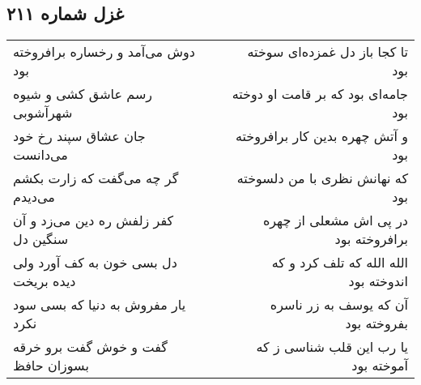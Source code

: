\begin{center}
\section*{غزل شماره ۲۱۱}
\label{sec:sh211}
\begin{longtable}{l p{0.5cm} r}
دوش می‌آمد و رخساره برافروخته بود
&&
تا کجا باز دل غمزده‌ای سوخته بود
\\
رسم عاشق کشی و شیوه شهرآشوبی
&&
جامه‌ای بود که بر قامت او دوخته بود
\\
جان عشاق سپند رخ خود می‌دانست
&&
و آتش چهره بدین کار برافروخته بود
\\
گر چه می‌گفت که زارت بکشم می‌دیدم
&&
که نهانش نظری با من دلسوخته بود
\\
کفر زلفش ره دین می‌زد و آن سنگین دل
&&
در پی اش مشعلی از چهره برافروخته بود
\\
دل بسی خون به کف آورد ولی دیده بریخت
&&
الله الله که تلف کرد و که اندوخته بود
\\
یار مفروش به دنیا که بسی سود نکرد
&&
آن که یوسف به زر ناسره بفروخته بود
\\
گفت و خوش گفت برو خرقه بسوزان حافظ
&&
یا رب این قلب شناسی ز که آموخته بود
\\
\end{longtable}
\end{center}
